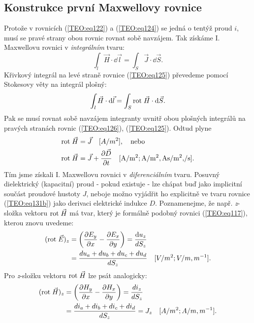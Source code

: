     \subsection{Konstrukce první Maxwellovy rovnice}
      Protože v rovnicích (\ref{TEO:eq122}) a (\ref{TEO:eq124}) se jedná o tentýž 
      proud \(i\), musí se pravé strany obou rovnic rovnat sobě navzájem. Tak získáme I. 
      Maxwellovu rovnici v \emph{integrálním} tvaru:
      \begin{equation}\label{TEO:eq125}
        \int_l \vec{H}\cdot \dd{\vec{l}} = \int_S \vec{J}\cdot \dd{\vec{S}}.
      \end{equation} 
      Křivkový integrál na levé straně rovnice (\ref{TEO:eq125}) převedeme pomocí Stokesovy 
      věty na integrál plošný:	
      \begin{equation}\label{TEO:eq126}
        \int_l \vec{H}\cdot \mathop{}\!\mathrm{d}\vec{l} = \int_S \mathrm{rot}\;\vec{H}\cdot \mathop{}\!\mathrm{d}\vec{S}.
      \end{equation} 
      Pak se musí rovnat sobě navzájem integranty uvnitř obou plošných integrálů na pravých 
      stranách rovnic (\ref{TEO:eq126}), (\ref{TEO:eq125}). Odtud plyne
      \begin{subequations}
        \begin{align}
          \rot{H} &= \vec{J} \quad [A/m^2], \quad\text{nebo}      \label{TEO:eq131a} \\
          \rot{H} &= \vec{J} + \pder{\vec{D}}{t} 
                     \quad %
                     [\si[per-mode=fraction]{\A\per\square\m; \A\per\square\m, \A\s\per\square\m, \per\s}].  \label{TEO:eq131b}
        \end{align}
      \end{subequations}
      Tím jsme získali I. Maxwellovu rovnici v \emph{diferenciálním} tvaru. Posuvný dielektrický 
      (kapacitní) proud - pokud existuje - lze chápat buď jako implicitní součást proudové hustoty 
      \(J\), neboje možno vyjádřit ho explicitně ve tvaru rovnice (\ref{TEO:eq131b}) 
      jako derivaci elektrické indukce \(D\). Poznamenejme, že např. \emph{z}-složka vektoru 
      \(\mathrm{rot}\;\vec{H}\) má tvar, který je formálně podobný rovnici (\ref{TEO:eq117}), kterou 
      znovu uvedeme:
      \begin{align*}
         (\mathrm{rot}\;\vec{E})_z &= \left(\dfrac{\partial E_y}{\partial x} - \dfrac{\partial E_x}{\partial y}\right)
                      = \frac{\mathop{}\!\mathrm{d}u_z}{dS_z}                                                  \\
                     &= \frac{du_a + du_b + du_c + du_d}{dS_z} \quad[V/m^2; V/m, m^{-1}].
      \end{align*}
      Pro \emph{z}-složku vektoru \(\mathrm{rot}\;\vec{H}\) lze psát analogicky:
      \begin{align*}
        (\mathrm{rot}\;\vec{H})_z &= \left(\dfrac{\partial H_y}{\partial x} - \dfrac{\partial H_x}{\partial y}\right)
                     = \frac{di_z}{dS_z}                                                   \\
                    &= \frac{di_a + di_b + di_c + di_d}{dS_z} = J_z \quad[A/m^2; A/m, m^{-1}].
      \end{align*}
      
